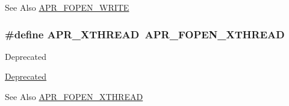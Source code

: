 \begin{DoxySeeAlso}{See Also}
\hyperlink{group__apr__file__open__flags_gac598bb95fc9476b0bf2ed0b1c308842c}{A\-P\-R\-\_\-\-F\-O\-P\-E\-N\-\_\-\-W\-R\-I\-T\-E} 
\end{DoxySeeAlso}
\hypertarget{group__apr__file__open__flags_gaa9120c0e395d8a0e640b5eafa8f11cce}{
\subsubsection[{A\-P\-R\-\_\-\-X\-T\-H\-R\-E\-A\-D}]{\setlength{\rightskip}{0pt plus 5cm}\#define A\-P\-R\-\_\-\-X\-T\-H\-R\-E\-A\-D~{\bf A\-P\-R\-\_\-\-F\-O\-P\-E\-N\-\_\-\-X\-T\-H\-R\-E\-A\-D}}}\label{group__apr__file__open__flags_gaa9120c0e395d8a0e640b5eafa8f11cce}
\begin{DoxyRefDesc}{Deprecated}
\item[\hyperlink{deprecated__deprecated000026}{Deprecated}]\end{DoxyRefDesc}
\begin{DoxySeeAlso}{See Also}
\hyperlink{group__apr__file__open__flags_ga435cd9b2604b11796779c23ffa00a3dd}{A\-P\-R\-\_\-\-F\-O\-P\-E\-N\-\_\-\-X\-T\-H\-R\-E\-A\-D} 
\end{DoxySeeAlso}
